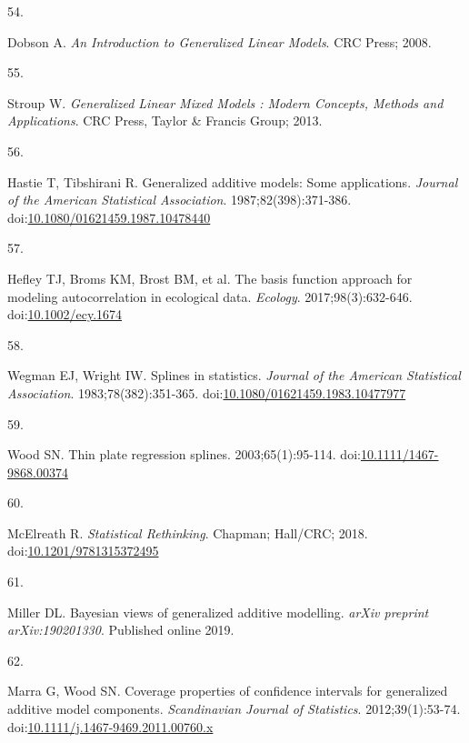 \documentclass[
]{article}
\newlength{\cslhangindent}
\newlength{\csllabelwidth}
\newlength{\cslentryspacingunit} %
\newenvironment{CSLReferences}[2] %
 {%
  \setlength{\parindent}{0pt}
  \ifodd #1
  \let\oldpar\par
  \def\par{\hangindent=\cslhangindent\oldpar}
  \fi
  \setlength{\parskip}{#2\cslentryspacingunit}
 }%
 {}
\newcommand{\CSLLeftMargin}[1]{\parbox[t]{\csllabelwidth}{#1}}
\newcommand{\CSLRightInline}[1]{\parbox[t]{\linewidth - \csllabelwidth}{#1}\break}
\begin{document}
\begin{CSLReferences}{0}{0}
\leavevmode{}%
\CSLLeftMargin{54. }
\CSLRightInline{Dobson A. \emph{An Introduction to Generalized Linear Models}. CRC Press; 2008.}

\leavevmode{}%
\CSLLeftMargin{55. }
\CSLRightInline{Stroup W. \emph{Generalized Linear Mixed Models : Modern Concepts, Methods and Applications}. CRC Press, Taylor \& Francis Group; 2013.}

\leavevmode{}%
\CSLLeftMargin{56. }
\CSLRightInline{Hastie T, Tibshirani R. Generalized additive models: Some applications. \emph{Journal of the American Statistical Association}. 1987;82(398):371-386. doi:\href{https://doi.org/10.1080/01621459.1987.10478440}{10.1080/01621459.1987.10478440}}

\leavevmode{}%
\CSLLeftMargin{57. }
\CSLRightInline{Hefley TJ, Broms KM, Brost BM, et al. The basis function approach for modeling autocorrelation in ecological data. \emph{Ecology}. 2017;98(3):632-646. doi:\href{https://doi.org/10.1002/ecy.1674}{10.1002/ecy.1674}}

\leavevmode{}%
\CSLLeftMargin{58. }
\CSLRightInline{Wegman EJ, Wright IW. Splines in statistics. \emph{Journal of the American Statistical Association}. 1983;78(382):351-365. doi:\href{https://doi.org/10.1080/01621459.1983.10477977}{10.1080/01621459.1983.10477977}}

\leavevmode{}%
\CSLLeftMargin{59. }
\CSLRightInline{Wood SN. Thin plate regression splines. 2003;65(1):95-114. doi:\href{https://doi.org/10.1111/1467-9868.00374}{10.1111/1467-9868.00374}}

\leavevmode{}%
\CSLLeftMargin{60. }
\CSLRightInline{McElreath R. \emph{Statistical Rethinking}. Chapman; Hall/{CRC}; 2018. doi:\href{https://doi.org/10.1201/9781315372495}{10.1201/9781315372495}}

\leavevmode{}%
\CSLLeftMargin{61. }
\CSLRightInline{Miller DL. Bayesian views of generalized additive modelling. \emph{arXiv preprint arXiv:190201330}. Published online 2019.}

\leavevmode{}%
\CSLLeftMargin{62. }
\CSLRightInline{Marra G, Wood SN. Coverage properties of confidence intervals for generalized additive model components. \emph{Scandinavian Journal of Statistics}. 2012;39(1):53-74. doi:\href{https://doi.org/10.1111/j.1467-9469.2011.00760.x}{10.1111/j.1467-9469.2011.00760.x}}


\end{CSLReferences}
\end{document}
